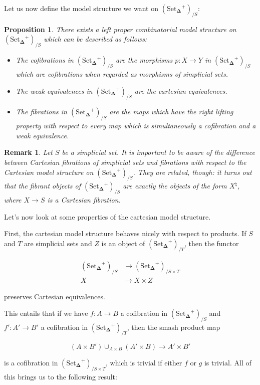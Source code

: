 \documentclass[12pt]{amsart}
\newcommand{\8}{\ensuremath{\infty}}
\newcommand{\SSet}{\ensuremath{\text{Set}_{\boldsymbol{\Delta}}}}
\newtheorem{proposition}{Proposition}
\newtheorem{remark}{Remark}
\begin{document}
Let us now define the model structure we want on $(\SSet^+)_{/S}$:
\begin{proposition}
  There exists a left proper combinatorial model structure on $(\SSet^+)_{/S}$ which can be described as follows:
  \begin{itemize}
    \item[(C)] The cofibrations in $(\SSet^+)_{/S}$ are the morphisms $p: X \rightarrow Y$ in $(\SSet^+)_{/S}$ which are cofibrations when regarded as morphisms of simplicial sets.
    \item[(W)] The weak equivalences in $(\SSet^+)_{/S}$ are the cartesian equivalences.
    \item[(F)] The fibrations in $(\SSet^+)_{/S}$ are the maps which have the right lifting property with respect to every map which is simultaneously a cofibration and a weak equivalence.
  \end{itemize}
\end{proposition}

\begin{remark}
  Let $S$ be a simplicial set. It is important to be aware of the difference between Cartesian fibrations of simplicial sets and fibrations with respect to the Cartesian model structure on $(\SSet^+)_{/S}$. They are related, though: it turns out that the fibrant objects of $(\SSet^+)_{/S}$ are exactly the objects of the form $X^\natural$, where $X \rightarrow S$ is a Cartesian fibration.
\end{remark}

Let's now look at some properties of the cartesian model structure.

First, the cartesian model structure behaves nicely with respect to products. If $S$ and $T$ are simplicial sets and $Z$ is an object of $(\SSet^+)_{/T}$, then the functor

\begin{align*}
  (\SSet^+)_{/S} & \rightarrow (\SSet^+)_{/S\times T} \\
  X              & \mapsto X\times Z
\end{align*}

preserves Cartesian equivalences.

This entails that if we have $f: A \rightarrow B$ a cofibration in $(\SSet^+)_{/S}$ and $f': A' \rightarrow B'$ a cofibration in $(\SSet^+)_{/T}$, then the smash product map

$$
  (A\times B')\displaystyle \cup_{A\times B}(A'\times B) \rightarrow A'\times B'
$$

is a cofibration in $(\SSet^+)_{/S\times T}$, which is trivial if either $f$ or $g$ is trivial. All of this brings us to the following result:
\end{document}
